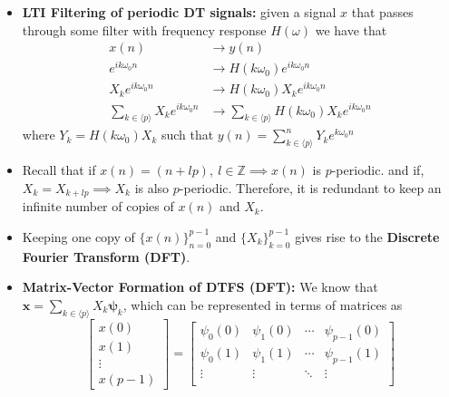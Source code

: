 \begin{itemize}
	\item \textbf{LTI Filtering of periodic DT signals:} given a signal $x$ that passes through
	      some filter with frequency response $H(\omega)$ we have that
	      \begin{align*}
		      x(n)                                                 & \longrightarrow  y(n)                                                            \\
		      e^{ik\omega_0 n}                                     & \longrightarrow  H(k\omega_0)e^{ik\omega_0 n}                                    \\
		      X_{k}e^{ik\omega_0 n}                                & \longrightarrow  H(k\omega_0)X_{k}e^{ik\omega_0 n}                               \\
		      \sum_{k \in \langle p \rangle} X_{k}e^{ik\omega_0 n} & \longrightarrow \sum_{k \in \langle p \rangle} H(k\omega_0)X_{k}e^{ik\omega_0 n}
	      \end{align*}
	      where $Y_{k} = H(k\omega_0)X_{k}$ such that $y(n) = \sum_{k \in \langle p \rangle}^{n} Y_{k}e^{k\omega_0 n}$
	\item Recall that if $x(n) = (n+lp),\ l \in \mathbb{Z} \implies x(n)$ is $p$-periodic.
	      and if, $X_{k} = X_{k+lp} \implies X_{k}$ is also $p$-periodic. Therefore,
	      it is redundant to keep an infinite number of copies of $x(n)$ and $X_{k}$.
	\item Keeping one copy of $\{x(n)\}_{n=0}^{p-1}$ and $\{X_{k}\}_{k=0}^{p-1}$ gives rise to the
	      \textbf{Discrete Fourier Transform (DFT)}.
	\item \textbf{Matrix-Vector Formation of DTFS (DFT):} We know that $\bm{x} = \sum_{k \in \langle p \rangle} X_{k}\bm{\psi}_{k}$,
	      which can be represented in terms of matrices as
	      \[
		      \begin{bmatrix}
			      x(0)   \\
			      x(1)   \\
			      \vdots \\
			      x(p-1)
		      \end{bmatrix} =
		      \begin{bmatrix}
			      \psi_{0}(0)   & \psi_{1}(0)   & \cdots & \psi_{p-1}(0)   \\
			      \psi_{0}(1)   & \psi_{1}(1)   & \cdots & \psi_{p-1}(1)   \\
			      \vdots        & \vdots        & \ddots & \vdots          \\

\end{bmatrix}\]
\end{itemize}
